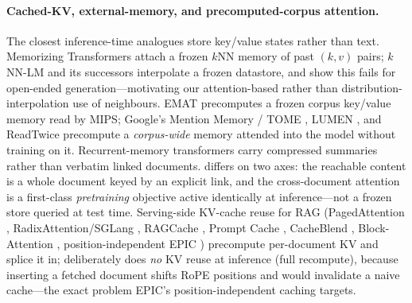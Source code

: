 \paragraph{Cached-KV, external-memory, and precomputed-corpus attention.}
The closest inference-time analogues store key/value states rather than text.
Memorizing Transformers \citep{wu2022memorizing} attach a frozen $k$NN memory of past
$(k,v)$ pairs; $k$NN-LM \citep{khandelwal2020knnlm} and its successors
\citep{yogatama2021spalm,he2021efficientknnlm,alon2022retomaton,xu2023whyknnlm}
interpolate a frozen datastore, and \citet{wang2023knnlmgeneration} show this fails for
open-ended generation---motivating our attention-based rather than
distribution-interpolation use of neighbours. EMAT \citep{wu2022emat} precomputes a
frozen corpus key/value memory read by MIPS; Google's Mention Memory / TOME
\citep{dejong2022tome}, LUMEN \citep{dejong2023lumen}, and ReadTwice
\citep{zemlyanskiy2021readtwice} precompute a \emph{corpus-wide} memory attended into
the model without training on it. Recurrent-memory transformers
\citep{dai2019transformerxl,rae2020compressive,bulatov2022rmt,hutchins2022blockrecurrent}
carry compressed summaries rather than verbatim linked documents.
\method differs on two axes: the reachable content is a whole document keyed by an
explicit link, and the cross-document attention is a first-class \emph{pretraining}
objective active identically at inference---not a frozen store queried at test time.
Serving-side KV-cache reuse for RAG (PagedAttention \citep{kwon2023pagedattention},
RadixAttention/SGLang \citep{zheng2024sglang}, RAGCache \citep{jin2024ragcache},
Prompt Cache \citep{gim2024promptcache}, CacheBlend \citep{yao2025cacheblend},
Block-Attention \citep{ma2025blockattention}, position-independent EPIC
\citep{hu2024epic}) precompute per-document KV and splice it in; \method deliberately
does \emph{no} KV reuse at inference (full recompute), because inserting a fetched
document shifts RoPE positions and would invalidate a naive cache---the exact problem
EPIC's position-independent caching targets.


